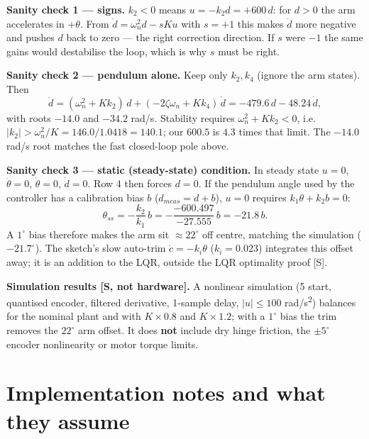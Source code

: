 \documentclass[11pt,a4paper]{article}
\begin{document}
\textbf{Sanity check 1 — signs.} $k_2<0$ means $u=-k_2d=+600\,d$: for $d>0$ the arm accelerates in $+\theta$. From $\ddot d=\omega_n^2d-sKu$ with $s=+1$ this makes $\ddot d$ more negative and pushes $d$ back to zero — the right correction direction. If $s$ were $-1$ the same gains would destabilise the loop, which is why $s$ must be right.

\textbf{Sanity check 2 — pendulum alone.} Keep only $k_2,k_4$ (ignore the arm states). Then
\begin{equation*}
\ddot d=(\omega_n^2+Kk_2)\,d+(-2\zeta\omega_n+Kk_4)\,\dot d=-479.6\,d-48.24\,\dot d,
\end{equation*}
with roots $-14.0$ and $-34.2$ rad/s. Stability requires $\omega_n^2+Kk_2<0$, i.e. $|k_2|>\omega_n^2/K=146.0/1.0418=140.1$; our $600.5$ is $4.3$ times that limit. The $-14.0$ rad/s root matches the fast closed-loop pole above.

\textbf{Sanity check 3 — static (steady-state) condition.} In steady state $u=0$, $\ddot\theta=0$, $\dot\theta=0$, $\dot d=0$. Row 4 then forces $d=0$. If the pendulum angle used by the controller has a calibration bias $b$ ($d_{meas}=d+b$), $u=0$ requires $k_1\theta+k_2b=0$:
\begin{equation*}
\theta_{ss}=-\frac{k_2}{k_1}\,b=-\frac{-600.497}{-27.555}\,b=-21.8\,b .
\end{equation*}
A $1^\circ$ bias therefore makes the arm sit $\approx22^\circ$ off centre, matching the simulation ($-21.7^\circ$). The sketch's slow auto-trim $\dot c=-k_i\theta$ ($k_i=0.023$) integrates this offset away; it is an addition to the LQR, outside the LQR optimality proof [S].

\textbf{Simulation results [S, not hardware].} A nonlinear simulation (5\textdegree{} start, quantised encoder, filtered derivative, 1-sample delay, $|u|\le100$ rad/s\textsuperscript{2}) balances for the nominal plant and with $K\times0.8$ and $K\times1.2$; with a $1^\circ$ bias the trim removes the $22^\circ$ arm offset. It does \textbf{not} include dry hinge friction, the $\pm5^\circ$ encoder nonlinearity or motor torque limits.


\section{Implementation notes and what they assume}
\end{document}
